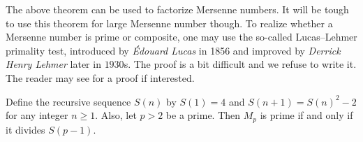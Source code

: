 \documentclass{subfiles}
\begin{document}
	The above theorem can be used to factorize Mersenne numbers. It will be tough to use this theorem for large Mersenne number though. To realize whether a Mersenne number is prime or composite, one may use the so-called Lucas–Lehmer primality test, introduced by \textit{\'Edouard Lucas} in 1856 and improved by \textit{Derrick Henry Lehmer} later in $1930$s. The proof is a bit difficult and we refuse to write it. The reader may see \textcite{bruce_1993} for a proof if interested.

		\begin{theorem}
			Define the recursive sequence $S(n)$ by $S(1)=4$ and $S(n+1)=S(n)^2-2$ for any integer $n \geq 1$. Also, let $p>2$ be a prime. Then $M_p$ is prime if and only if it divides $S(p-1)$.
		\end{theorem}
\end{document}
